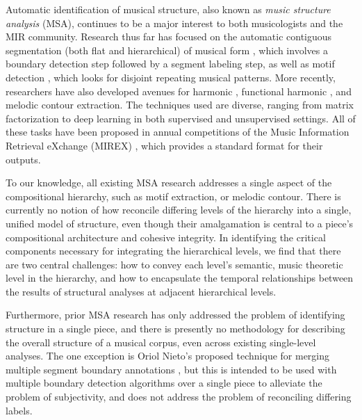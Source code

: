 \documentclass{article}
\begin{document}
Automatic identification of musical structure, also known as \textit{music structure analysis} (MSA), continues to be a major interest to both musicologists and the MIR community. Research thus far has focused on the automatic contiguous segmentation (both flat and hierarchical) of musical form \cite{msaf, checkerboard, sf, vmo_segmentation, cnmf, 2dfmc, eval_hier, olda, scluster, musicaiz, repetition_grammars_ismir2023, buisson_2022, cmu_dannenberg_2020}, which involves a boundary detection step followed by a segment labeling step, as well as motif detection \cite{Hsiao_2023_motifs, vmo_motifs}, which looks for disjoint repeating musical patterns. More recently, researchers have also developed avenues for harmonic \cite{chen_2019_harmony}, functional harmonic \cite{chen_2018_harmony}, and melodic \cite{salamon_2013_melody, kosta_22_melody, chou2021_melody_midibert} contour extraction. The techniques used are diverse, ranging from matrix factorization to deep learning in both supervised and unsupervised settings. All of these tasks have been proposed in annual competitions of the Music Information Retrieval eXchange (MIREX) \cite{MIREX_2017_form, MIREX_2017_motif, MIREX_2010_harmony}, which provides a standard format for their outputs. 

To our knowledge, all existing MSA research addresses a single aspect of the compositional hierarchy, such as motif extraction, or melodic contour. There is currently no notion of how reconcile differing levels of the hierarchy into a single, unified model of structure, even though their amalgamation is central to a piece's compositional architecture and cohesive integrity. In identifying the critical components necessary for integrating the hierarchical levels, we find that there are two central challenges: how to convey each level's semantic, music theoretic level in the hierarchy, and how to encapsulate the temporal relationships between the results of structural analyses at adjacent hierarchical levels. 

Furthermore, prior MSA research has only addressed the problem of identifying structure in a single piece, and there is presently no methodology for describing the overall structure of a musical corpus, even across existing single-level analyses. The one exception is Oriol Nieto's proposed technique for merging multiple segment boundary annotations \cite{msaf}, but this is intended to be used with multiple boundary detection algorithms over a single piece to alleviate the problem of subjectivity, and does not address the problem of reconciling differing labels.  
\end{document}
